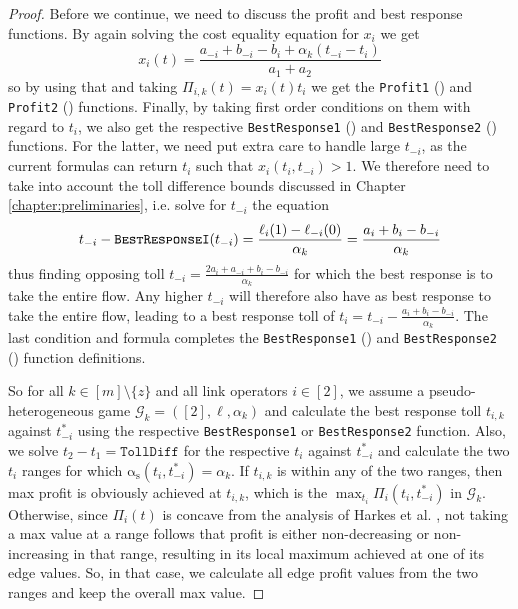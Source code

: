 \documentclass[10pt,a4paper]{book}
\newcommand{\as}{\mathrm{\alpha_s}}
\newcommand{\Gm}{\mathcal{G}}
\theoremstyle{definition}
\theoremstyle{comment}
\begin{document}
\begin{proof}
	Before we continue, we need to discuss the profit and best response functions.
	By again solving the cost equality equation for $x_i$ we get
	\[
		x_i(t) = \frac{a_{-i} + b_{-i} - b_i + \alpha_k (t_{-i} - t_i)}{a_1 + a_2}
	\]
	so by using that and taking $\Pi_{i, k}(t) = x_i(t) t_i$ we get the \texttt{Profit1} () and \texttt{Profit2} () functions.
	Finally, by taking first order conditions on them with regard to $t_i$, we also get the respective \texttt{BestResponse1} () and \texttt{BestResponse2} () functions.
	For the latter, we need put extra care to handle large $t_{-i}$, as the current formulas can return $t_i$ such that $x_i(t_i, t_{-i}) > 1$.
	We therefore need to take into account the toll difference bounds discussed in Chapter \ref{chapter:preliminaries}, i.e. solve for $t_{-i}$ the equation
	\[
		t_{-i} - \Call{\texttt{BestResponseI}}{t_{-i}} = \frac{\ell_i(1) - \ell_{-i}(0)}{\alpha_k} = \frac{a_i + b_i - b_{-i}}{\alpha_k}
	\]
	thus finding opposing toll $t_{-i} = \frac{2 a_i + a_{-i} + b_i - b_{-i}}{\alpha_k}$ for which the best response is to take the entire flow.
	Any higher $t_{-i}$ will therefore also have as best response to take the entire flow, leading to a best response toll of $t_i = t_{-i} - \frac{a_i + b_i - b_{-i}}{\alpha_k}$.
	The last condition and formula completes the \texttt{BestResponse1} () and \texttt{BestResponse2} () function definitions.

	So for all $k \in [m] \setminus \{z\}$ and all link operators $i \in [2]$, we assume a pseudo-heterogeneous game $\Gm_k = ([2], \ell, \alpha_k)$ and calculate the best response toll $t_{i, k}$ against $t_{-i}^*$ using the respective \texttt{BestResponse1} or \texttt{BestResponse2} function.
	Also, we solve $t_2 - t_1 = \texttt{TollDiff}$ for the respective $t_i$ against $t_{-i}^*$ and calculate the two $t_i$ ranges for which $\as(t_i, t_{-i}^*) = \alpha_k$.
	If $t_{i, k}$ is within any of the two ranges, then max profit is obviously achieved at $t_{i, k}$, which is the $\max_{t_i} \Pi_i(t_i, t_{-i}^*)$ in $\Gm_k$.
	Otherwise, since $\Pi_i(t)$ is concave from the analysis of Harkes et al. \cite{Harks_2019}, not taking a max value at a range follows that profit is either non-decreasing or non-increasing in that range, resulting in its local maximum achieved at one of its edge values.
	So, in that case, we calculate all edge profit values from the two ranges and keep the overall max value.


\end{proof}
\end{document}
